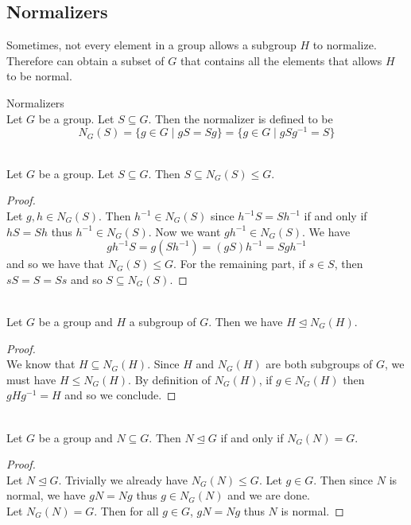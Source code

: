 \documentclass[a4paper]{article}
\begin{document}
\subsection{Normalizers}
Sometimes, not every element in a group allows a subgroup $H$ to normalize. Therefore can obtain a subset of $G$ that  contains all the elements that allows $H$ to be normal. 

\begin{defn}{Normalizers}{}\\
Let $G$ be a group. Let $S\subseteq G$. Then the normalizer is defined to be $$N_G(S)=\{g\in G\;|\;gS=Sg\}=\{g\in G\;|\;gSg^{-1}=S\}$$
\end{defn}

\begin{prp}{}{}\\
Let $G$ be a group. Let $S\subseteq G$. Then $S\subseteq N_G(S)\leq G$. 
\begin{proof}\\
Let $g,h\in N_G(S)$. Then $h^{-1}\in N_G(S)$ since $h^{-1}S=Sh^{-1}$ if and only if $hS=Sh$ thus $h^{-1}\in N_G(S)$. Now we want $gh^{-1}\in N_G(S)$. We have $$gh^{-1}S=g(Sh^{-1})=(gS)h^{-1}=Sgh^{-1}$$ and so we have that $N_G(S)\leq G$. For the remaining part, if $s\in S$, then $sS=S=Ss$ and so $S\subseteq N_G(S)$. 
\end{proof}
\end{prp}

\begin{prp}{}{}\\
Let $G$ be a group and $H$ a subgroup of $G$. Then we have $H\trianglelefteq N_G(H)$. 
\begin{proof}\\
We know that $H\subseteq N_G(H)$. Since $H$ and $N_G(H)$ are both subgroups of $G$, we must have $H\leq N_G(H)$. By definition of $N_G(H)$, if $g\in N_G(H)$ then $gHg^{-1}=H$ and so we conclude. 
\end{proof}
\end{prp}

\begin{prp}{}{}\\
Let $G$ be a group and $N\subseteq G$. Then $N\trianglelefteq G$ if and only if $N_G(N)=G$. 
\begin{proof}\\
Let $N\trianglelefteq G$. Trivially we already have $N_G(N)\leq G$. Let $g\in G$. Then since $N$ is normal, we have $gN=Ng$ thus $g\in N_G(N)$ and we are done. \\
Let $N_G(N)=G$. Then for all $g\in G$, $gN=Ng$ thus $N$ is normal. 
\end{proof}
\end{prp}
\end{document}
